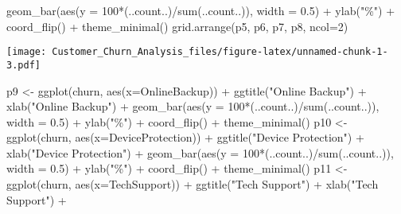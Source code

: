 \documentclass[
]{article}
\newenvironment{Shaded}{\begin{snugshade}}{\end{snugshade}}
\newcommand{\AttributeTok}[1]{\textcolor[rgb]{0.77,0.63,0.00}{#1}}
\newcommand{\DecValTok}[1]{\textcolor[rgb]{0.00,0.00,0.81}{#1}}
\newcommand{\FloatTok}[1]{\textcolor[rgb]{0.00,0.00,0.81}{#1}}
\newcommand{\FunctionTok}[1]{\textcolor[rgb]{0.00,0.00,0.00}{#1}}
\newcommand{\NormalTok}[1]{#1}
\newcommand{\OtherTok}[1]{\textcolor[rgb]{0.56,0.35,0.01}{#1}}
\newcommand{\SpecialCharTok}[1]{\textcolor[rgb]{0.00,0.00,0.00}{#1}}
\newcommand{\StringTok}[1]{\textcolor[rgb]{0.31,0.60,0.02}{#1}}
\begin{document}
\begin{Shaded}
\begin{Highlighting}[]
  \FunctionTok{geom\_bar}\NormalTok{(}\FunctionTok{aes}\NormalTok{(}\AttributeTok{y =} \DecValTok{100}\SpecialCharTok{*}\NormalTok{(..count..)}\SpecialCharTok{/}\FunctionTok{sum}\NormalTok{(..count..)), }\AttributeTok{width =} \FloatTok{0.5}\NormalTok{) }\SpecialCharTok{+} \FunctionTok{ylab}\NormalTok{(}\StringTok{"\%"}\NormalTok{) }\SpecialCharTok{+} \FunctionTok{coord\_flip}\NormalTok{() }\SpecialCharTok{+} \FunctionTok{theme\_minimal}\NormalTok{()}
\FunctionTok{grid.arrange}\NormalTok{(p5, p6, p7, p8, }\AttributeTok{ncol=}\DecValTok{2}\NormalTok{)}
\end{Highlighting}
\end{Shaded}

\texttt{[image: Customer\_Churn\_Analysis\_files/figure-latex/unnamed-chunk-1-3.pdf]}

\begin{Shaded}
\begin{Highlighting}[]
\NormalTok{p9 }\OtherTok{\textless{}{-}} \FunctionTok{ggplot}\NormalTok{(churn, }\FunctionTok{aes}\NormalTok{(}\AttributeTok{x=}\NormalTok{OnlineBackup)) }\SpecialCharTok{+} \FunctionTok{ggtitle}\NormalTok{(}\StringTok{"Online Backup"}\NormalTok{) }\SpecialCharTok{+} \FunctionTok{xlab}\NormalTok{(}\StringTok{"Online Backup"}\NormalTok{) }\SpecialCharTok{+}
  \FunctionTok{geom\_bar}\NormalTok{(}\FunctionTok{aes}\NormalTok{(}\AttributeTok{y =} \DecValTok{100}\SpecialCharTok{*}\NormalTok{(..count..)}\SpecialCharTok{/}\FunctionTok{sum}\NormalTok{(..count..)), }\AttributeTok{width =} \FloatTok{0.5}\NormalTok{) }\SpecialCharTok{+} \FunctionTok{ylab}\NormalTok{(}\StringTok{"\%"}\NormalTok{) }\SpecialCharTok{+} \FunctionTok{coord\_flip}\NormalTok{() }\SpecialCharTok{+} \FunctionTok{theme\_minimal}\NormalTok{()}
\NormalTok{p10 }\OtherTok{\textless{}{-}} \FunctionTok{ggplot}\NormalTok{(churn, }\FunctionTok{aes}\NormalTok{(}\AttributeTok{x=}\NormalTok{DeviceProtection)) }\SpecialCharTok{+} \FunctionTok{ggtitle}\NormalTok{(}\StringTok{"Device Protection"}\NormalTok{) }\SpecialCharTok{+} \FunctionTok{xlab}\NormalTok{(}\StringTok{"Device Protection"}\NormalTok{) }\SpecialCharTok{+} 
  \FunctionTok{geom\_bar}\NormalTok{(}\FunctionTok{aes}\NormalTok{(}\AttributeTok{y =} \DecValTok{100}\SpecialCharTok{*}\NormalTok{(..count..)}\SpecialCharTok{/}\FunctionTok{sum}\NormalTok{(..count..)), }\AttributeTok{width =} \FloatTok{0.5}\NormalTok{) }\SpecialCharTok{+} \FunctionTok{ylab}\NormalTok{(}\StringTok{"\%"}\NormalTok{) }\SpecialCharTok{+} \FunctionTok{coord\_flip}\NormalTok{() }\SpecialCharTok{+} \FunctionTok{theme\_minimal}\NormalTok{()}
\NormalTok{p11 }\OtherTok{\textless{}{-}} \FunctionTok{ggplot}\NormalTok{(churn, }\FunctionTok{aes}\NormalTok{(}\AttributeTok{x=}\NormalTok{TechSupport)) }\SpecialCharTok{+} \FunctionTok{ggtitle}\NormalTok{(}\StringTok{"Tech Support"}\NormalTok{) }\SpecialCharTok{+} \FunctionTok{xlab}\NormalTok{(}\StringTok{"Tech Support"}\NormalTok{) }\SpecialCharTok{+} 

\end{Highlighting}
\end{Shaded}
\end{document}
